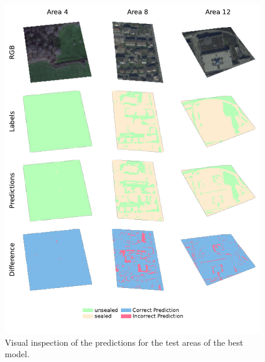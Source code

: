 \begin{figure}[H]
    \centering
    \captionsetup{width=0.8\linewidth}
    \includegraphics{figures/best_model_visual.pdf}
    \caption{Visual inspection of the predictions for the test areas of the best model.}
    \label{fig:best_model_visual}
\end{figure}